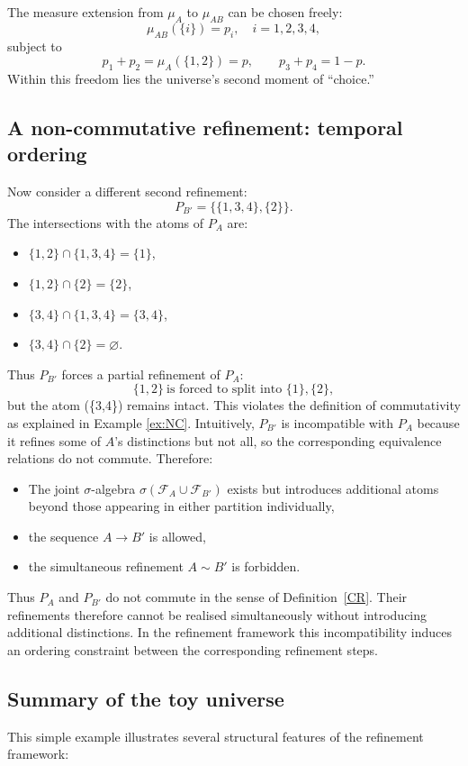 \documentclass[
 amsmath,amssymb,
  onecolumn %
]{revtex4-2}
\begin{document}
The measure extension from $\mu_A$ to $\mu_{AB}$ can be chosen freely:
$$
\mu_{AB}(\{i\}) = p_i,\quad i=1,2,3,4,
$$
subject to
$$
p_1+p_2 = \mu_A(\{1,2\}) = p,\qquad
p_3+p_4 = 1-p.
$$
Within this freedom lies the universe’s second moment of “choice.”


\subsection{A non-commutative refinement: temporal ordering} 
Now consider a different second refinement:
$$
P_{B'} = \big\{\{1,3,4\},\{ 2\}\big\}.
$$
The intersections with the atoms of $P_A$ are:
\begin{itemize}
\item $\{1,2\} \cap \{1,3,4\} = \{1\}$,
\item $\{1,2\} \cap \{2\} = \{2\}$,
\item $\{3,4\} \cap \{1,3,4\} = \{3,4\}$,
\item $\{3,4\} \cap \{2\} = \varnothing$.
\end{itemize}
Thus $P_{B'}$ forces a partial refinement of $P_A$:
$$
\{1,2\} \ \text{is forced to split into } \{1\},\{2\},
$$
but the atom (\{3,4\}) remains intact. This violates the definition of commutativity as explained in Example \ref{ex:NC}. 
Intuitively,
$P_{B'}$ is incompatible with $P_A$ because it refines some of $A$’s distinctions but not all, so the corresponding equivalence relations do not commute.
Therefore:
\begin{itemize}
\item	The joint $\sigma$-algebra $\sigma(\mathcal F_A\cup\mathcal F_{B'})$
exists but introduces additional atoms beyond those appearing in
either partition individually, 
\item	the sequence $A \rightarrow B'$ is allowed,
\item	the simultaneous refinement $A\sim B'$ is forbidden.
\end{itemize}
Thus $P_A$ and $P_{B'}$ do not commute in the sense of
Definition~\ref{CR}. Their refinements therefore cannot be realised
simultaneously without introducing additional distinctions. In the refinement framework this incompatibility induces an ordering constraint between the corresponding refinement steps.

\subsection{Summary of the toy universe} 
This simple example illustrates several structural features of the
refinement framework:
\end{document}
